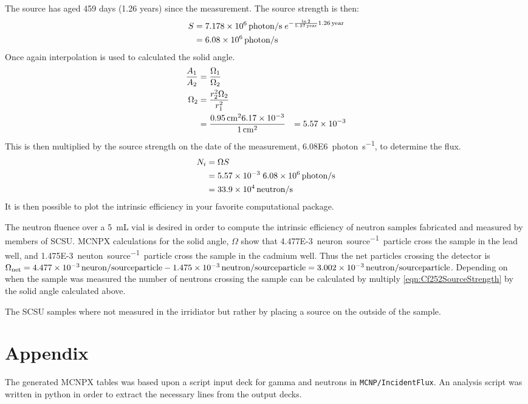 \documentclass[draftcls,onecolumn]{IEEEtran}
\begin{document}
\begin{Exercise*}[label={PEN LiF with ADS},title={PEN LiF film with ADS},name={Example}]
The  source has aged 459 days (1.26 years) since the measurement.
The source strength is then:
\begin{align}
  S &= \SI{7.178E6}{photon\per\second}\;e^{-\frac{ \ln{2}}{\SI{5.27}{year}}\SI{1.26}{year}} \\ \notag
    &= \SI{6.08E6}{photon\per\second}
\end{align}
Once again interpolation is used to calculated the solid angle.
\begin{align*}
	\frac{A_1}{A_2} &= \frac{\Omega_1}{\Omega_2} \\ \notag
	\Omega_2 &= \frac{r_2^2 \Omega_2}{r_1^2} \\
	 &= \frac{\SI{0.95}{\cm}^2 \num{6.17E-3}}{\SI{1}{\cm}^2}
	 &= \num{5.57E-3}
\end{align*}
This is then multiplied by the source strength on the date of the measurement, \SI{6.08E6}{photon\per\second}, to determine the flux.
\begin{align*}
 	N_i &= \Omega S \\
	 &= \num{5.57E-3} \; \SI{6.08E6}{photon\per\second} \\
      &= \SI{33.9E4}{neutron\per\second}
\end{align*}
It is then possible to plot the intrinsic efficiency in your favorite computational package.

\end{Exercise*}
\begin{Exercise*}[label={LiquidSample},title={Liquid Sample},name={Example}]
The neutron fluence over a \SI{5}{\milli\liter} vial is desired in order to compute the intrinsic efficiency of neutron samples fabricated and measured by members of SCSU.
MCNPX calculations for the solid angle, $\Omega$ show that \SI{4.477E-3}{neuron\per source particle} cross the sample in the lead well, and \SI{1.475E-3}{neuton\per source particle} cross the sample in the cadmium well.
Thus the net particles crossing the detector is $\Omega_{\text{net}} =\SI{4.477E-3}{neuron\per source particle} - \SI{1.475E-3}{neutron\per source particle} =\SI{3.002E-3}{neutron\per source particle} $.
Depending on when the sample was measured the number of neutrons crossing the sample can be calculated by multiply \eqref{eqn:Cf252SourceStrength} by the solid angle calculated above.

The SCSU samples where not measured in the  irridiator but rather by placing a source on the outside of the sample.

\end{Exercise*}



\section{Appendix}
The generated MCNPX tables was based upon a script input deck for gamma and neutrons in \verb+MCNP/IncidentFlux+.
An analysis script was written in python in order to extract the necessary lines from the output decks.
\end{document}
